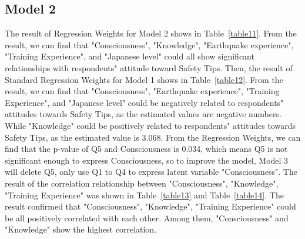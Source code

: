 \fi

\subsection{Model 2}

The result of Regression Weights for Model 2 shows in Table~\ref{table11}. From the result, we can find that "Consciousness", "Knowledge", "Earthquake experience", "Training Experience", and "Japanese level" could all show significant relationships with respondents" attitude toward Safety Tips. Then, the result of Standard Regression Weights for Model 1 shows in Table~\ref{table12}. From the result, we can find that "Consciousness", "Earthquake experience", "Training Experience", and "Japanese level" could be negatively related to respondents" attitudes towards Safety Tips, as the estimated values are negative numbers. While "Knowledge" could be positively related to respondents" attitudes towards Safety Tips, as the estimated value is 3.068. From the  Regression Weights, we can find that the p-value of Q5 and Consciousness is 0.034, which means Q5 is not significant enough to express Consciousness, so to improve the model, Model 3 will delete Q5, only use Q1 to Q4 to express latent variable "Consciousness". The result of the correlation relationship between "Consciousness", "Knowledge", "Training Experience" was shown in Table~\ref{table13} and Table~\ref{table14}. The result confirmed that "Consciousness", "Knowledge", "Training Experience" could be all positively correlated with each other. Among them, "Consciousness" and "Knowledge" show the highest correlation. 

